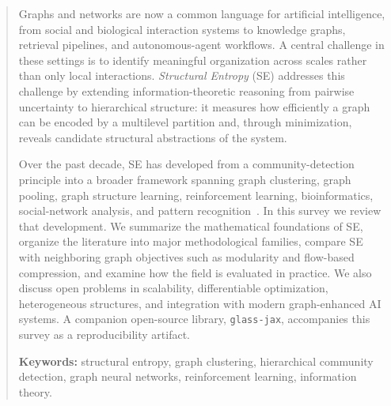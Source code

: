 \begin{abstract}
Graphs and networks are now a common language for artificial intelligence,
from social and biological interaction systems to knowledge graphs, retrieval
pipelines, and autonomous-agent workflows.
A central challenge in these settings is to identify meaningful organization
across scales rather than only local interactions.
\emph{Structural Entropy} (SE) addresses this challenge by extending
information-theoretic reasoning from pairwise uncertainty to hierarchical
structure: it measures how efficiently a graph can be encoded by a multilevel
partition and, through minimization, reveals candidate structural abstractions
of the system.

Over the past decade, SE has developed from a community-detection principle
into a broader framework spanning graph clustering, graph pooling, graph
structure learning, reinforcement learning, bioinformatics, social-network
analysis, and pattern recognition~\cite{Li2016,wu2022pooling,zeng2025sidmJMLR,zhang2021supertad,peng2024zjyun,zhu2023HiTIN}.
In this survey we review that development.
We summarize the mathematical foundations of SE, organize the literature into
major methodological families, compare SE with neighboring graph objectives
such as modularity and flow-based compression, and examine how the field is
evaluated in practice.
We also discuss open problems in scalability, differentiable optimization,
heterogeneous structures, and integration with modern graph-enhanced AI
systems.
A companion open-source library, \texttt{glass-jax}, accompanies this survey
as a reproducibility artifact.

\medskip\noindent\textbf{Keywords:} structural entropy, graph clustering,
hierarchical community detection, graph neural networks, reinforcement learning,
information theory.
\end{abstract}
